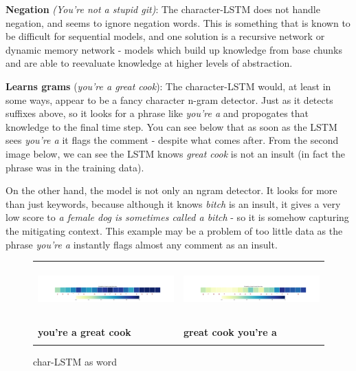 \documentclass{article} %
\begin{document}
\textbf{Negation} \textit{(You’re not a stupid git)}:
The character-LSTM does not handle negation, and seems to ignore negation words. This is something that is known to be difficult for sequential models, and one solution is a recursive network or dynamic memory network - models which build up knowledge from base chunks and are able to reevaluate knowledge at higher levels of abstraction. 

\textbf{Learns grams} (\textit{you're a great cook}):
The character-LSTM would, at least in some ways, appear to be a fancy character n-gram detector. Just as it detects suffixes above, so it looks for a phrase like \textit{you're a} and propogates that knowledge to the final time step. You can see below that as soon as the LSTM sees \textit{you're a} it flags the comment - despite what comes after. From the second image below, we can see the LSTM knows \textit{great cook} is not an insult (in fact the phrase was in the training data).

On the other hand, the model is not only an ngram detector. It looks for more than just keywords, because although it knows \textit{bitch} is an insult, it gives a very low score to \textit{a female dog is sometimes called a bitch} - so it is somehow capturing the mitigating context. This example may be a problem of too little data as the phrase \textit{you're a} instantly flags almost any comment as an insult. 

\begin{figure}[H]
\begin{tabular}{ll}
\hspace*{-1cm} \includegraphics[width=8cm, height=2cm]{youre_a_great_cook.png} & 
\hspace*{-1cm} \includegraphics[width=8cm, height=2cm]{great_cook_youre_a.png} \\
\vspace*{-2.1cm} \\
\hspace*{1.6cm} {\color{bostonuniversityred} \textbf{you're a great cook }} & 
\hspace*{1.8cm} {\color{bostonuniversityred} \textbf{great cook you're a }}\\
\vspace*{0.6cm} \\ 
\end{tabular}
\caption{char-LSTM as word}
\end{figure}
\end{document}
